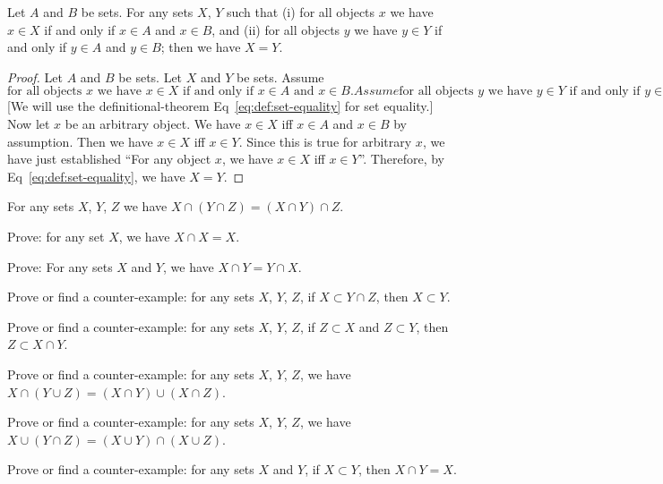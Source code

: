 \begin{theorem}
Let $A$ and $B$ be sets.
For any sets $X$, $Y$ such that (i) for all objects $x$ we have $x\in X$
if and only if $x\in A$ and $x\in B$, and (ii) for all objects $y$ we
have $y\in Y$ if and only if $y\in A$ and $y\in B$;
then we have $X=Y$.
\end{theorem}

\begin{proof}
Let $A$ and $B$ be sets. Let $X$ and $Y$ be sets. Assume
\begin{subequations}
  \begin{equation}
\mbox{for all objects $x$ we have $x\in X$ if and only if $x\in A$ and $x\in B$.}
  \end{equation}
  Assume
  \begin{equation}
\mbox{for all objects $y$ we have $y\in Y$ if and only if $y\in A$ and $y\in B$}.
  \end{equation}
\end{subequations}
[We will use the definitional-theorem Eq~\eqref{eq:def:set-equality} for
set equality.]
Now let $x$ be an arbitrary object. We have $x\in X$ iff $x\in A$ and
$x\in B$ by assumption. Then we have $x\in X$ iff $x\in Y$.
Since this is true for arbitrary $x$, we have just established ``For any
object $x$, we have $x\in X$ iff $x\in Y$''. Therefore, by Eq~\eqref{eq:def:set-equality},
we have $X=Y$.
\end{proof}

\begin{proposition}
For any sets $X$, $Y$, $Z$ we have $X\cap(Y\cap Z)=(X\cap Y)\cap Z$.
\end{proposition}

\begin{xca}
Prove: for any set $X$, we have $X\cap X=X$.
\end{xca}

\begin{xca}
Prove: For any sets $X$ and $Y$, we have $X\cap Y=Y\cap X$.
\end{xca}

\begin{xca}
Prove or find a counter-example: for any sets $X$, $Y$, $Z$, if
$X\subset Y\cap Z$, then $X\subset Y$.
\end{xca}

\begin{xca}
Prove or find a counter-example: for any sets $X$, $Y$, $Z$, if
$Z\subset X$ and $Z\subset Y$, then $Z\subset X\cap Y$.
\end{xca}

\begin{xca}
Prove or find a counter-example: for any sets $X$, $Y$, $Z$,
we have $X\cap(Y\cup Z)=(X\cap Y)\cup(X\cap Z)$.
\end{xca}

\begin{xca}
Prove or find a counter-example: for any sets $X$, $Y$, $Z$,
we have $X\cup(Y\cap Z)=(X\cup Y)\cap(X\cup Z)$.
\end{xca}

\begin{xca}
Prove or find a counter-example: for any sets $X$ and $Y$, if $X\subset Y$,
then $X\cap Y=X$.
\end{xca}
